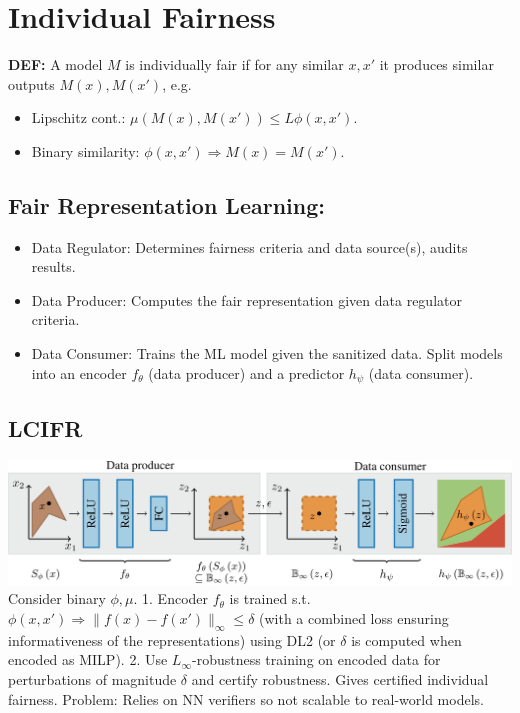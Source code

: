 \section{Individual Fairness}
\textbf{DEF:} A model $M$ is individually fair if for any similar $x,x'$ it produces similar outputs $M(x),M(x')$, e.g.
\begin{itemize}
    \item Lipschitz cont.: $\mu(M(x),M(x'))\le L\phi(x,x')$.
    \item Binary similarity: $\phi(x,x')\Rightarrow M(x)=M(x')$.
\end{itemize}

\subsection*{Fair Representation Learning:}
\begin{itemize}
    \item Data Regulator: Determines fairness criteria and data source(s), audits results.
    \item Data Producer: Computes the fair representation given data regulator criteria.
    \item Data Consumer: Trains the ML model given the sanitized data.
          Split models into an encoder $f_\theta$ (data producer) and a predictor $h_\psi$ (data consumer).
\end{itemize}

\subsection*{LCIFR}
\includegraphics[width=1\columnwidth]{img/lcifr.png}
Consider binary $\phi,\mu$. 1. Encoder $f_\theta$ is trained s.t. $\phi(x, x') \Rightarrow \|f(x) - f(x')\|_\infty \leq \delta$ (with a combined loss ensuring informativeness of the representations) using DL2 (or $\delta$ is computed when encoded as MILP). 2. Use $L_\infty$-robustness training on encoded data for perturbations of magnitude $\delta$ and certify robustness. Gives certified individual fairness. Problem: Relies on NN verifiers so not scalable to real-world models.

